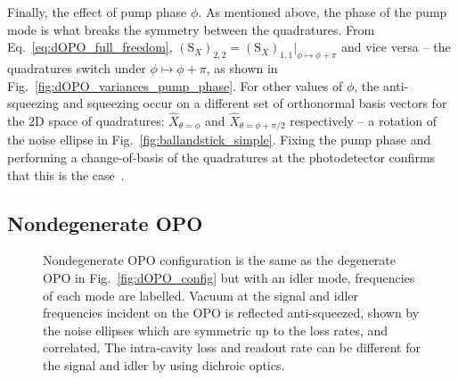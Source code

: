 Finally, the effect of pump phase $\phi$. As mentioned above, the phase of the pump mode is what breaks the symmetry between the quadratures. From Eq.~\ref{eq:dOPO_full_freedom}, $(\text{S}_X)_{2,2}=(\text{S}_X)_{1,1}|_{\phi\mapsto\phi+\pi}$ and vice versa -- the quadratures switch under $\phi\mapsto\phi+\pi$, as shown in Fig.~\ref{fig:dOPO_variances_pump_phase}. For other values of $\phi$, the anti-squeezing and squeezing occur on a different set of orthonormal basis vectors for the 2D space of quadratures: $\hat{X}_{\theta=\phi}$ and $\hat{X}_{\theta=\phi+\pi/2}$ respectively  -- a rotation of the noise ellipse in Fig.~\ref{fig:ballandstick_simple}. 
Fixing the pump phase and performing a change-of-basis of the quadratures at the photodetector confirms that this is the case~\cite{}.




\subsection{Nondegenerate OPO}

\begin{figure}
	\centering
	\caption{Nondegenerate OPO configuration is the same as the degenerate OPO in Fig.~\ref{fig:dOPO_config} but with an idler mode, frequencies of each mode are labelled. Vacuum at the signal and idler frequencies incident on the OPO is reflected anti-squeezed, shown by the noise ellipses which are symmetric up to the loss rates, and correlated. The intra-cavity loss and readout rate can be different for the signal and idler by using dichroic optics.}
	\label{fig:nOPO_config}
\end{figure}

